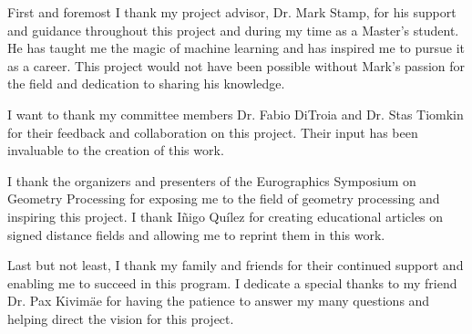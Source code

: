 
First and foremost I thank my project advisor, Dr. Mark Stamp, for his support and guidance throughout this project and during my time as a Master's student. He has taught me the magic of machine learning and has inspired me to pursue it as a career. This project would not have been possible without Mark's passion for the field and dedication to sharing his knowledge.

I want to thank my committee members Dr. Fabio DiTroia and Dr. Stas Tiomkin for their feedback and collaboration on this project. Their input has been invaluable to the creation of this work.

I thank the organizers and presenters of the Eurographics Symposium on Geometry Processing for exposing me to the field of geometry processing and inspiring this project. I thank I{\~n}igo Qu{\'i}lez for creating educational articles on signed distance fields and allowing me to reprint them in this work.

Last but not least, I thank my family and friends for their continued support and enabling me to succeed in this program. I dedicate a special thanks to my friend Dr. Pax Kivim{\"a}e for having the patience to answer my many questions and helping direct the vision for this project.